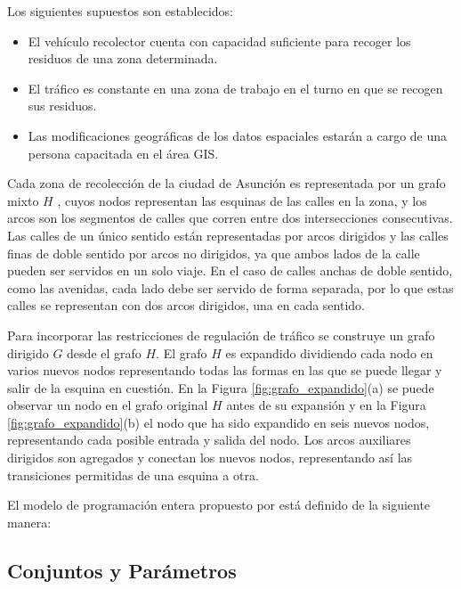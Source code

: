 Los siguientes supuestos son establecidos:

\begin{itemize}
    \item El vehículo recolector cuenta con capacidad suficiente para recoger los residuos de una zona determinada.
    \item El tráfico es constante en una zona de trabajo en el turno en que se recogen sus residuos.
    \item Las modificaciones geográficas de los datos espaciales estarán a cargo de una persona capacitada en el área GIS.
\end{itemize}

Cada zona de recolección de la ciudad de Asunción es representada por un grafo mixto $H$ \citep{Braier2017AnArgentina}, cuyos nodos representan las esquinas de las calles en la zona, y los arcos son los segmentos de calles que corren entre dos intersecciones consecutivas. Las calles de un único sentido están representadas por arcos dirigidos y las calles finas de doble sentido por arcos no dirigidos, ya que ambos lados de la calle pueden ser servidos en un solo viaje. En el caso de calles anchas de doble sentido, como las avenidas, cada lado debe ser servido de forma separada, por lo que estas calles se representan con dos arcos dirigidos, una en cada sentido.

Para incorporar las restricciones de regulación de tráfico se construye un grafo dirigido $G$ desde el grafo $H$. El grafo $H$ es expandido dividiendo cada nodo en varios nuevos nodos representando todas las formas en las que se puede llegar y salir de la esquina en cuestión. En la Figura \ref{fig:grafo_expandido}(a) se puede observar un nodo en el grafo original $H$ antes de su expansión y en la Figura \ref{fig:grafo_expandido}(b) el nodo que ha sido expandido en seis nuevos nodos, representando cada posible entrada y salida del nodo. Los arcos auxiliares dirigidos son agregados y conectan los nuevos nodos, representando así las transiciones permitidas de una esquina a otra.

El modelo de programación entera propuesto por \citet{Braier2017AnArgentina} está definido de la siguiente manera:

\subsection{Conjuntos y Parámetros}
\label{sec:conjunto-parametros}

